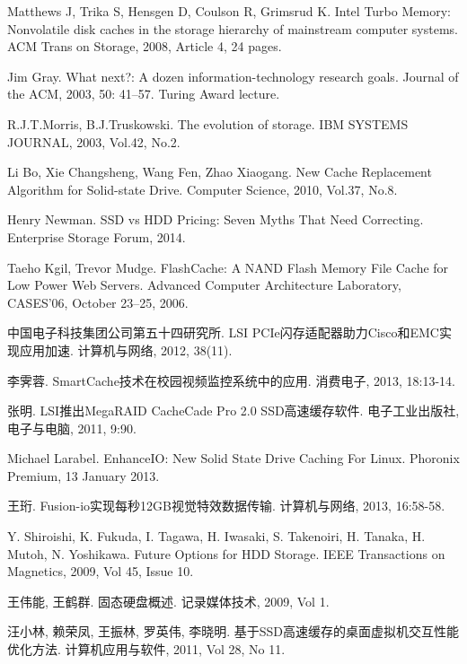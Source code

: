 ﻿\begin{thebibliography}

Matthews J, Trika S, Hensgen D, Coulson R, Grimsrud K. Intel Turbo Memory: Nonvolatile disk caches in the storage hierarchy of mainstream computer systems. ACM Trans on Storage, 2008, Article 4, 24 pages.

Jim Gray. What next?: A dozen information-technology research goals. Journal of the ACM, 2003, 50: 41–57. Turing Award lecture.

R.J.T.Morris, B.J.Truskowski. The evolution of storage. IBM SYSTEMS JOURNAL, 2003, Vol.42, No.2.

Li Bo, Xie Changsheng, Wang Fen, Zhao Xiaogang. New Cache Replacement Algorithm for Solid-state Drive. Computer Science, 2010, Vol.37, No.8.

Henry Newman. SSD vs HDD Pricing: Seven Myths That Need Correcting. Enterprise Storage Forum, 2014.

Taeho Kgil, Trevor Mudge. FlashCache: A NAND Flash Memory File Cache for Low Power Web Servers. Advanced Computer Architecture Laboratory, CASES’06, October 23–25, 2006.

中国电子科技集团公司第五十四研究所. LSI PCIe闪存适配器助力Cisco和EMC实现应用加速. 计算机与网络, 2012, 38(11).

李霁蓉. SmartCache技术在校园视频监控系统中的应用. 消费电子, 2013, 18:13-14.

张明. LSI推出MegaRAID CacheCade Pro 2.0 SSD高速缓存软件. 电子工业出版社, 电子与电脑, 2011, 9:90.

Michael Larabel. EnhanceIO: New Solid State Drive Caching For Linux. Phoronix Premium, 13 January 2013.

王珩. Fusion-io实现每秒12GB视觉特效数据传输. 计算机与网络, 2013, 16:58-58.

Y. Shiroishi, K. Fukuda, I. Tagawa, H. Iwasaki, S. Takenoiri, H. Tanaka, H. Mutoh, N. Yoshikawa. Future Options for HDD Storage. IEEE Transactions on Magnetics, 2009, Vol 45, Issue 10.

王伟能, 王鹤群. 固态硬盘概述. 记录媒体技术, 2009, Vol 1.

汪小林, 赖荣凤, 王振林, 罗英伟, 李晓明. 基于SSD高速缓存的桌面虚拟机交互性能优化方法. 计算机应用与软件, 2011, Vol 28, No 11.


\end{thebibliography}
